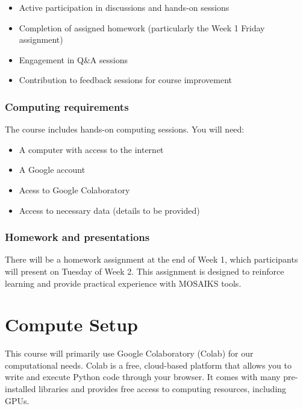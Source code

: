 \documentclass[
  letterpaper,
  DIV=11,
  numbers=noendperiod]{scrreprt}
\providecommand{\tightlist}{%
  \setlength{\itemsep}{0pt}\setlength{\parskip}{0pt}}\usepackage{longtable,booktabs,array}
\begin{document}
\begin{itemize}
\tightlist
\item
  Active participation in discussions and hands-on sessions
\item
  Completion of assigned homework (particularly the Week 1 Friday
  assignment)
\item
  Engagement in Q\&A sessions
\item
  Contribution to feedback sessions for course improvement
\end{itemize}

\hypertarget{computing-requirements}{%
\subsection*{Computing requirements}\label{computing-requirements}}

The course includes hands-on computing sessions. You will need:

\begin{itemize}
\tightlist
\item
  A computer with access to the internet
\item
  A Google account
\item
  Acess to Google Colaboratory
\item
  Access to necessary data (details to be provided)
\end{itemize}

\hypertarget{homework-and-presentations}{%
\subsection*{Homework and
presentations}\label{homework-and-presentations}}

There will be a homework assignment at the end of Week 1, which
participants will present on Tuesday of Week 2. This assignment is
designed to reinforce learning and provide practical experience with
MOSAIKS tools.

\hypertarget{compute-setup}{%
\chapter{Compute Setup}\label{compute-setup}}

This course will primarily use Google Colaboratory (Colab) for our
computational needs. Colab is a free, cloud-based platform that allows
you to write and execute Python code through your browser. It comes with
many pre-installed libraries and provides free access to computing
resources, including GPUs.
\end{document}
